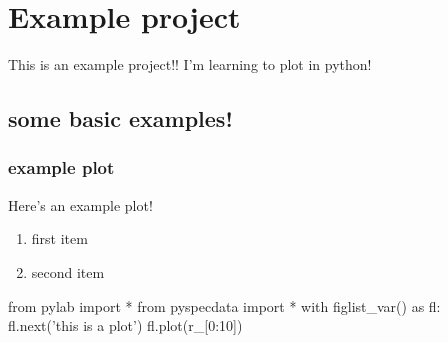 \section{Example project}
This is an example project!!
I'm learning to plot in python!
\subsection{some basic examples!}
\subsubsection{example plot}\label{sec:examplePlot1}
Here's an example plot!
\begin{enumerate}
\item first item
\item second item
\end{enumerate}
\par
\begin{python}[on]
from pylab import *
from pyspecdata import *
with figlist_var() as fl:
    fl.next('this is a plot')
    fl.plot(r_[0:10])
\end{python}
\par
